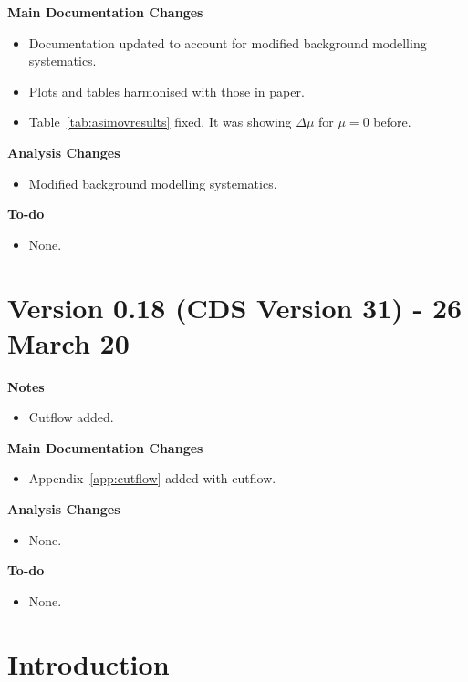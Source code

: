 \documentclass[NOTE, atlasdraft=true, texlive=2017, UKenglish]{\ATLASLATEXPATH atlasdoc}
\begin{document}
\textbf{Main Documentation Changes}
\begin{itemize}
\item Documentation updated to account for modified background modelling systematics.
\item Plots and tables harmonised with those in paper.
\item Table~\ref{tab:asimovresults} fixed. It was showing $\Delta\mu$ for $\mu =0$ before.
\end{itemize}

\textbf{Analysis Changes}
\begin{itemize}
\item Modified background modelling systematics.
\end{itemize}

\textbf{To-do}
\begin{itemize}
\item None.
\end{itemize}


\section*{Version 0.18 (CDS Version 31) - 26 March 20}

\textbf{Notes}
\begin{itemize}
\item Cutflow added.
\end{itemize}

\textbf{Main Documentation Changes}
\begin{itemize}
\item Appendix~\ref{app:cutflow} added with cutflow.
\end{itemize}

\textbf{Analysis Changes}
\begin{itemize}
\item None.
\end{itemize}

\textbf{To-do}
\begin{itemize}
\item None.
\end{itemize}


\clearpage
\tableofcontents
\clearpage

\clearpage
\section{Introduction}
\label{sec:intro}
\end{document}
